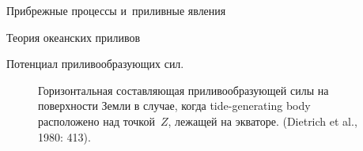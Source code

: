 \begin{chapter}{Прибрежные процессы и~приливные явления}
\begin{section}{Теория океанских приливов}
\begin{paragraph}{Потенциал приливообразующих сил.}
\begin{figure}[t!]
\caption{Горизонтальная составляющая приливообразующей силы на поверхности
Земли в случае, когда tide-generating body расположено над точкой~$Z$,
лежащей на экваторе. (Dietrich et al., 1980: 413).}
\label{fig:horiztideforce}
\end{figure}
%
%


\end{paragraph}
\end{section}
\end{chapter}
